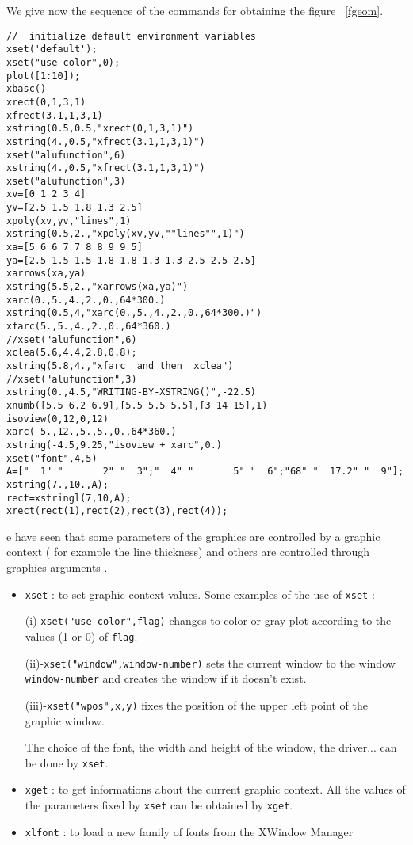 We give now the sequence of the commands for obtaining the 
figure~ \ref{fgeom}.

\begin{verbatim}
//	initialize default environment variables
xset('default');
xset("use color",0);
plot([1:10]);
xbasc()
xrect(0,1,3,1)
xfrect(3.1,1,3,1)
xstring(0.5,0.5,"xrect(0,1,3,1)")
xstring(4.,0.5,"xfrect(3.1,1,3,1)")
xset("alufunction",6)
xstring(4.,0.5,"xfrect(3.1,1,3,1)")
xset("alufunction",3)
xv=[0 1 2 3 4]
yv=[2.5 1.5 1.8 1.3 2.5]
xpoly(xv,yv,"lines",1)
xstring(0.5,2.,"xpoly(xv,yv,""lines"",1)")
xa=[5 6 6 7 7 8 8 9 9 5]
ya=[2.5 1.5 1.5 1.8 1.8 1.3 1.3 2.5 2.5 2.5]
xarrows(xa,ya)
xstring(5.5,2.,"xarrows(xa,ya)")
xarc(0.,5.,4.,2.,0.,64*300.)
xstring(0.5,4,"xarc(0.,5.,4.,2.,0.,64*300.)")
xfarc(5.,5.,4.,2.,0.,64*360.)
//xset("alufunction",6)
xclea(5.6,4.4,2.8,0.8);
xstring(5.8,4.,"xfarc  and then  xclea")
//xset("alufunction",3)
xstring(0.,4.5,"WRITING-BY-XSTRING()",-22.5) 
xnumb([5.5 6.2 6.9],[5.5 5.5 5.5],[3 14 15],1)
isoview(0,12,0,12)
xarc(-5.,12.,5.,5.,0.,64*360.)
xstring(-4.5,9.25,"isoview + xarc",0.)
xset("font",4,5)
A=["  1" "       2" "  3";"  4" "       5" "  6";"68" "  17.2" "  9"];
xstring(7.,10.,A);
rect=xstringl(7,10,A);
xrect(rect(1),rect(2),rect(3),rect(4));
\end{verbatim}



e have seen that some parameters of the graphics are controlled by a 
graphic context 
( for example the line thickness) and others are controlled through
graphics arguments . 
%
\begin{itemize}
	\item  {\tt xset}	: to set graphic context values.
Some examples of the use of {\tt xset} : 

(i)-{\tt xset("use color",flag)} changes to color or gray plot according to 
the values (1 or 0) of {\tt flag}.

(ii)-{\tt xset("window",window-number)} sets the current window to the window 
{\tt window-number} and creates the window if it doesn't exist.

(iii)-{\tt xset("wpos",x,y)} fixes the position of the upper left point of 
the graphic window.

The choice of the font, the width and height of the window, the driver...
can be done by {\tt xset}.

	\item  {\tt xget}	: to get informations about the current graphic context.
All the values of the parameters fixed by {\tt xset} can be obtained by 
{\tt xget}.

        \item  {\tt xlfont}	: to load a new family of fonts from the XWindow Manager
\end{itemize}
%
